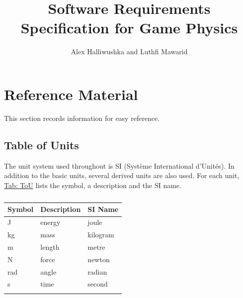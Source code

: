 \documentclass[12pt]{article}
\title{Software Requirements Specification for Game Physics}
\author{Alex Halliwushka and Luthfi Mawarid}
\begin{document}
\maketitle
\tableofcontents
\newpage
\section{Reference Material}
\label{Sec:RefMat}
This section records information for easy reference.
\subsection{Table of Units}
\label{Sec:ToU}
The unit system used throughout is SI (Système International d'Unités). In addition to the basic units, several derived units are also used. For each unit, \hyperref[Table:ToU]{Tab: ToU} lists the symbol, a description and the SI name.
\begin{longtable}{l l l}
\toprule
\textbf{Symbol} & \textbf{Description} & \textbf{SI Name}
\\
\midrule
\endhead
J & energy & joule
\\
kg & mass & kilogram
\\
m & length & metre
\\
N & force & newton
\\
rad & angle & radian
\\
s & time & second
\\
\bottomrule
\caption{}
\label{Table:ToU}
\end{longtable}
\end{document}
